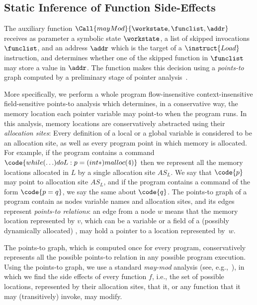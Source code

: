 


\subsection{Static Inference of Function Side-Effects}
\label{Se:MayMod}
\label{Se:IdentifyingLoads}
 
The auxiliary function $\Call{mayMod}{ \workstate, \funclist, \addr }$
receives as parameter a symbolic state $\workstate$, a list of skipped 
invocations $\funclist$, and an address $\addr$ which is the target of a $\instruct{Load}$ instruction,
and determines whether one of the skipped function in   $\funclist$ may store a value in $\addr$.
The function makes this decision using a \emph{points-to} graph 
computed by a preliminary stage of pointer analysis~\cite{Hind:Paste2001,Smaragdakis:FTPL2015}. 

More specifically, we perform a whole program flow-insensitive context-insensitive field-sensitive 
points-to analysis which determines, in a conservative way, the memory location each pointer variable may point-to
when the program runs.
In this analysis, memory locations are conservatively abstracted using their \emph{allocation sites}:
Every definition of a local or a global variable is considered to be an allocation site, as well as 
every program point in which memory is allocated.
For example, if the program contains a command $\code{while (\ldots) do L: p = (int*) malloc(4)}$ then 
we represent all the memory locations allocated in $L$ by a single allocation site $\mathit{AS}_L$.
We say that $\code{p}$ 
may point to allocation site $\mathit{AS}_L$, and if the 
program contains  a command of the form $\code{p=q}$, we say the same about $\code{q}$. 
The  points-to graph of a program 
contain as nodes variable names and allocation sites, and its edges represent \emph{points-to relations}:
an edge from 
a node $w$ means that the memory location represented by $v$, which can be a variable or a field of a 
(possibly dynamically allocated) , may hold a 
pointer to a location represented by~$w$.

The points-to graph, which  is computed once for every program,   conservatively represents all the possible points-to relation in any possible program execution.
Using the points-to graph, we use a standard \emph{may-mod} analysis (see, e.g.,~\cite{dragon-book}), in which 
we find the side effects of every function $f$, i.e.,  the set of possible locations, represented by their allocation sites,
that it, or any function that it may (transitively) invoke, may modify.




